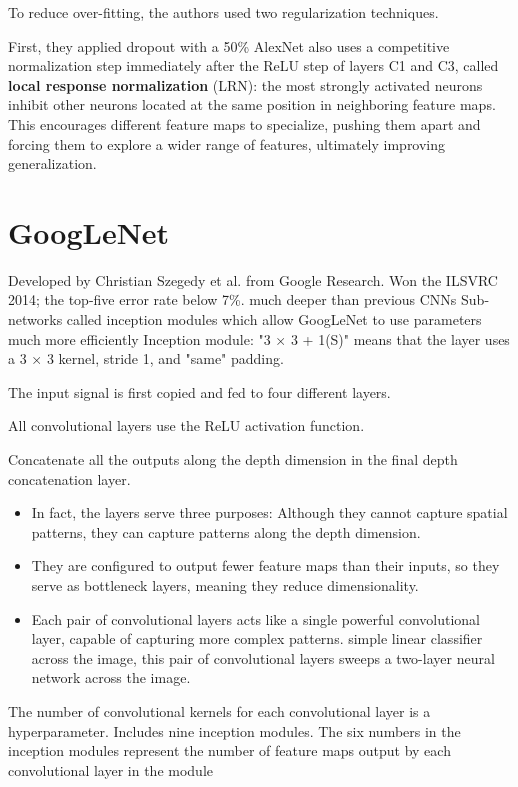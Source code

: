\documentclass[11pt]{article}
\begin{document}
To reduce over-fitting, the authors used two regularization techniques.

First, they applied dropout with a 50\% 
AlexNet also uses a competitive normalization step immediately after the
ReLU step of layers C1 and C3, called \textbf{local response normalization}
(LRN): the most strongly activated neurons inhibit other neurons located
at the same position in neighboring feature maps. This encourages
different feature maps to specialize, pushing them apart and forcing them
to explore a wider range of features, ultimately improving generalization.
\section{GoogLeNet}
\label{sec:org0354df6}

Developed by Christian Szegedy et al. from Google Research. 
Won the ILSVRC 2014; the top-five error rate below 7\%.
much deeper than previous CNNs 
Sub-networks called inception modules
which allow GoogLeNet to use parameters much more efficiently 
Inception module: 
"3 × 3 + 1(S)" means that the layer uses a 3 × 3 kernel, stride 1, 
and "same" padding. 

The input signal is first copied and fed to four different
layers. 

All convolutional layers use the ReLU activation function. 

Concatenate all the outputs along the depth dimension in the final depth
concatenation layer. 

\begin{itemize}
\item In fact, the layers serve three purposes:
Although they cannot capture spatial patterns, 
they can capture patterns along the depth dimension.
\item They are configured to output fewer feature maps than their inputs, 
so they serve as bottleneck layers, meaning they reduce dimensionality.
\item Each pair of convolutional layers acts like a single powerful convolutional
layer, capable of capturing more complex patterns. simple linear classifier
across the image, this pair of convolutional layers sweeps a two-layer neural
network across the image.
\end{itemize}

The number of convolutional kernels for each convolutional layer is a
hyperparameter. 
Includes nine inception modules. 
The six numbers in the inception modules represent the
number of feature maps output by each convolutional layer in the module
\end{document}
